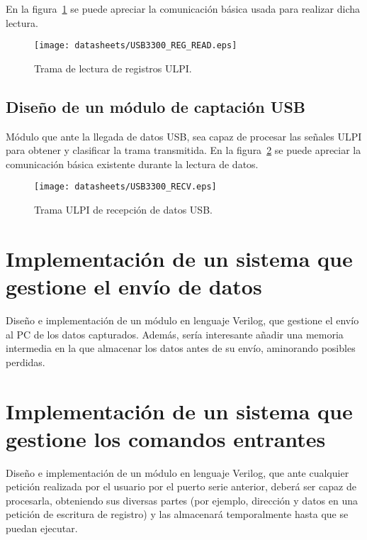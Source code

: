 En la figura~\ref{fig:ULPI_REG_READ} se puede apreciar la comunicación básica usada para realizar dicha lectura.
\begin{figure}[hbt]
    \centering
    \texttt{[image: datasheets/USB3300\_REG\_READ.eps]}
    \caption{Trama de lectura de registros ULPI.}
    \label{fig:ULPI_REG_READ}
\end{figure}

\subsection{Diseño de un módulo de captación USB}
Módulo que ante la llegada de datos USB, sea capaz de procesar las señales ULPI para obtener y clasificar la trama transmitida. En la figura~\ref{fig:ULPI_RECV} se puede apreciar la comunicación básica existente durante la lectura de datos.
\begin{figure}[hbt]
    \centering
    \texttt{[image: datasheets/USB3300\_RECV.eps]}
    \caption{Trama ULPI de recepción de datos USB.}
    \label{fig:ULPI_RECV}
\end{figure}



\section{Implementación de un sistema que gestione el envío de datos}
Diseño e implementación de un módulo en lenguaje Verilog, que gestione el envío al PC de los datos capturados. Además, sería interesante añadir una memoria intermedia en la que almacenar los datos antes de su envío, aminorando posibles perdidas.



\section{Implementación de un sistema que gestione los comandos entrantes}
Diseño e implementación de un módulo en lenguaje Verilog, que ante cualquier petición realizada por el usuario por el puerto serie anterior, deberá ser capaz de procesarla, obteniendo sus diversas partes (por ejemplo, dirección y datos en una petición de escritura de registro) y las almacenará temporalmente hasta que se puedan ejecutar.






